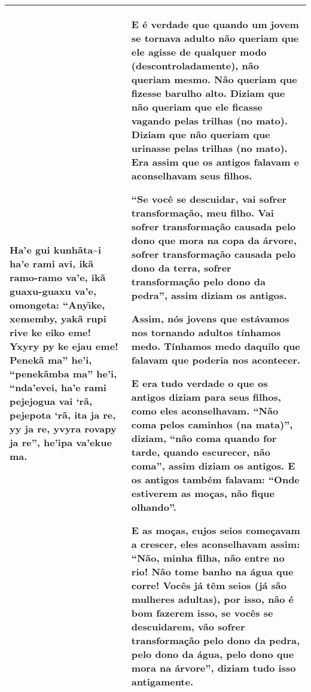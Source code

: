 \documentclass{article}
\begin{document}
\begin{flushleft}
\begin{supertabular}{m{2.86916in}|m{2.88656in}}
Ha{\textquoteright}e gui kunh\~ata\~\igue{\textquoteright}i
ha{\textquoteright}e rami avi, ik\~a ramo-ramo va{\textquoteright}e,
ik\~a guaxu-guaxu va{\textquoteright}e, omongeta:
{\textquotedblleft}Any\~\i ke, xememby, yak\~a rupi rive ke eiko eme!
Yxyry py ke ejau eme! Penek\~a ma{\textquotedblright}
he{\textquoteright}i, {\textquotedblleft}penek\~amba
ma{\textquotedblright} he{\textquoteright}i,
{\textquotedblleft}nda{\textquoteright}evei, ha{\textquoteright}e rami
pejejogua vai {\textquoteleft}r\~a, pejepota {\textquoteleft}r\~a, ita
ja re, yy ja re, yvyra rovapy ja re{\textquotedblright},
he{\textquoteright}ipa va{\textquoteright}ekue ma. &
E \'e verdade que quando um jovem se tornava adulto n\~ao queriam que
ele agisse de qualquer modo (descontroladamente), n\~ao queriam mesmo.
N\~ao queriam que fizesse barulho alto. Diziam que n\~ao queriam que
ele ficasse vagando pelas trilhas (no mato). Diziam que n\~ao queriam
que urinasse pelas trilhas (no mato). Era assim que os antigos falavam
e aconselhavam seus filhos. 

{\textquotedblleft}Se voc\^e se descuidar, vai sofrer
transforma\c{c}\~ao, meu filho. Vai sofrer transforma\c{c}\~ao causada
pelo dono que mora na copa da \'arvore, sofrer transforma\c{c}\~ao
causada pelo dono da terra, sofrer transforma\c{c}\~ao pelo dono da
pedra{\textquotedblright}, assim diziam os antigos. 

Assim, n\'os jovens que est\'avamos nos tornando adultos t\'inhamos
medo. T\'inhamos medo daquilo que falavam que poderia nos acontecer. 

E era tudo verdade o que os antigos diziam para seus filhos, como eles
aconselhavam. {\textquotedblleft}N\~ao coma pelos caminhos (na
mata){\textquotedblright}, diziam, {\textquotedblleft}n\~ao coma quando
for tarde, quando escurecer, n\~ao coma{\textquotedblright}, assim
diziam os antigos. E os antigos tamb\'em falavam:
{\textquotedblleft}Onde estiverem as mo\c{c}as, n\~ao fique
olhando{\textquotedblright}. 

E as mo\c{c}as, cujos seios come\c{c}avam a crescer, eles aconselhavam
assim: {\textquotedblleft}N\~ao, minha filha, n\~ao entre no rio! N\~ao
tome banho na \'agua que corre! Voc\^es j\'a t\^em seios (j\'a s\~ao
mulheres adultas), por isso, n\~ao \'e bom fazerem isso, se voc\^es se
descuidarem, v\~ao sofrer transforma\c{c}\~ao pelo dono da pedra, pelo
dono da \'agua, pelo dono que mora na \'arvore{\textquotedblright},
diziam tudo isso antigamente.\\\hline
\end{supertabular}
\end{flushleft}
\end{document}
